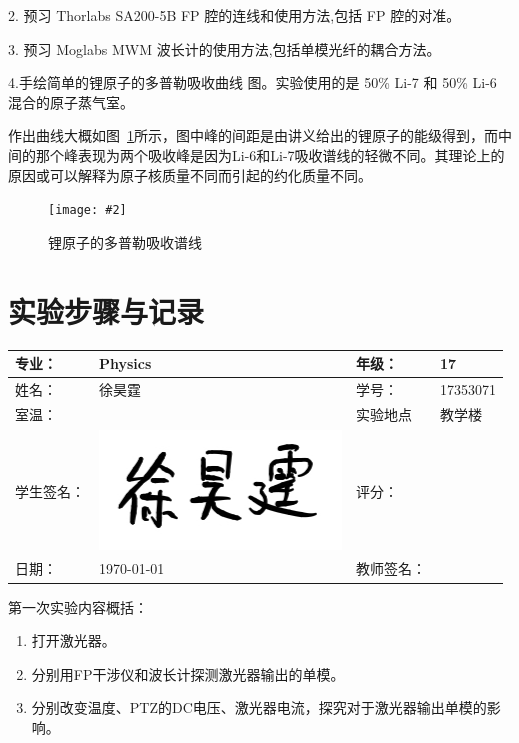 \documentclass[10pt,a4paper]{ctexart}
\newcommand{\cpic}[2]{
\begin{center}
\texttt{[image: \#2]}
\end{center}
}
\newcommand{\cpicn}[3]
{
\begin{figure}[H]
\cpic{#1}{#2}
\caption{\color{red}#3\label{#2}}
\end{figure}
}
\begin{document}
2. 预习 Thorlabs SA200-5B FP 腔的连线和使用方法,包括 FP 腔的对准。

3. 预习 Moglabs MWM 波长计的使用方法,包括单模光纤的耦合方法。

4.手绘简单的锂原子的多普勒吸收曲线
图。实验使用的是 50\% Li-7 和 50\% Li-6 混合的原子蒸气室。

作出曲线大概如图~\ref{Li}所示，图中峰的间距是由讲义给出的锂原子的能级得到，而中间的那个峰表现为两个吸收峰是因为Li-6和Li-7吸收谱线的轻微不同。其理论上的原因或可以解释为原子核质量不同而引起的约化质量不同。
\cpicn{0.3}{Li}{锂原子的多普勒吸收谱线}
\newpage
\section{实验步骤与记录}
\begin{center}
\begin{tabular}{|p{8em}|p{8em}|p{8em}|p{8em}|}
	\hline 
	专业：     &Physics       &年级：      & 17     \\
	\hline
	姓名：& 徐昊霆 &学号：&17353071  \\
	\hline
	室温：&                    &实验地点 & 教学楼 \\
	\hline	
	学生签名： &\includegraphics[scale=0.2]{sign} & 评分： & \\
	\hline
	日期： & \today & 教师签名：&  \\
	\hline
\end{tabular}
\end{center}
第一次实验内容概括：
\begin{enumerate}
	\item 打开激光器。
	\item 分别用FP干涉仪和波长计探测激光器输出的单模。
	\item 分别改变温度、PTZ的DC电压、激光器电流，探究对于激光器输出单模的影响。
\end{enumerate}
\end{document}
